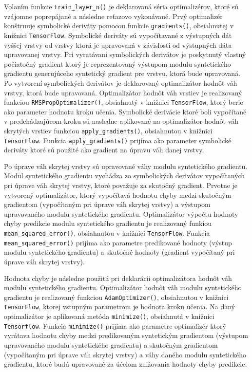 Volaním funkcie \texttt{train_layer_n()} je deklarovaná séria optimalizérov, ktoré sú vzájomne poprepájané a následne reťazovo vykonávané. Prvý optimalizér konštruuje symbolické deriváty pomocou funkcie \texttt{gradients()}, obsiahnutej v knižnici \texttt{TensorFlow}. Symbolické deriváty sú vypočítavané z výstupných dát vyššej vrstvy od vrstvy ktorá je upravovaná v závislosti od výstupných dáta upravovanej vrstvy. Pri vyratávani symbolických derivátov je poskytnutý vlastný počiatočný gradient ktorý je reprezentovaný výstupom modulu syntetického gradientu generujúceho syntetický gradient pre vrstvu, ktorá bude upravovaná. Po vytvorení symbolických derivátov je deklarovaný optimalizátor hodnôt váh vrstvy, ktorá bude upravovaná. Optimalizátor hodnôt váh vrstiev je realizovaný funkciou \texttt{RMSPropOptimalizer()}, obsiahnutý v knižnici \texttt{TensorFlow}, ktorý berie ako parameter hodnotu kroku učenia. Symbolické derivácie ktoré boli vypočítané v predchádzajúcom kroku sú nasledne aplikované na optimalizátor hodnôt váh skrytých vrstiev funkciou \texttt{apply_gradients()}, obsiahnutou v knižnici \texttt{TensorFlow}. Funkcia \texttt{apply_gradients()} prijíma ako parameter symbolické deriváty ktoré sú použité ako gradient na úpravu váh danej vrstvy. 

Po úprave váh skrytej vrstvy sú upravované váhy modulu syntetického gradientu. Modul syntetického gradientu vychádza zo symbolických derivátov vypočítaných pri úprave váh skrytej vrstvy, ktoré považuje za skutočný gradient. Prvotne je vytvorený optimalizátor, ktorý vypočítavá hodnotu chyby medzi skutočným gradientom (vypočítaným pri úprave váh skrytej vrstvy) a výstupom upravovaného modulu syntetického gradientu. Optimalizátor výpočtu hodnoty chyby predikcie modulu syntetického gradientu je realizovaný funkiou \texttt{mean_squared_error()}, obsiahnutou v knižnici \texttt{TensorFlow}. Funkcia \texttt{mean_squared_error()} prijíma ako parametre predikované hodnoty (výstup modulu syntetického gradientu) a skutočné hodnoty (gradient vypočítaný pri úprave váh skrytej vrstvy).

Hodnota chyby je následne použitá pri deklarácii optimalizátora hodnôt váh modulu syntetického gradientu. Optimalizátor hodnôt váh modulu syntetického gradientu je realizovaný funkciou \texttt{AdamOptimizer()}, obsiahnutou v knižnici \texttt{TensorFlow}, ktorej vstupným parametrom je hodnota kroku učenia. Na daný optimalizátor je aplikovaná metóda \texttt{minimize()}, obsiahnutá v knižnici \texttt{Tensorflow}. Funkcia \texttt{minimize()} prijíma ako parametre optimalizér ktorý vyrátava hodnotu chyby medzi predikovaným syntetickým gradientom (výstupom upravovaného modulu syntetického gradientu) a skutočným gradientom (vypočítaným pri úprave váh skrytej vrstvy) a váhy daného modulu syntetického gradientu, ktoré budú upravované za účelom znižovania hodnoty chyby predikcie.

